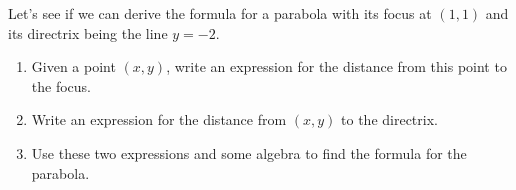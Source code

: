 \begin{prob}
Let's see if we can derive the formula for a parabola with its focus at $(1,1)$ and its directrix being the line $y=-2$.
\begin{enumerate}
\item Given a point $(x,y)$, write an expression for the distance from this point to the focus.
\item Write an expression for the distance from $(x,y)$ to the directrix. 
\item Use these two expressions and some algebra to find the formula for the parabola. 
\end{enumerate}
\end{prob}



